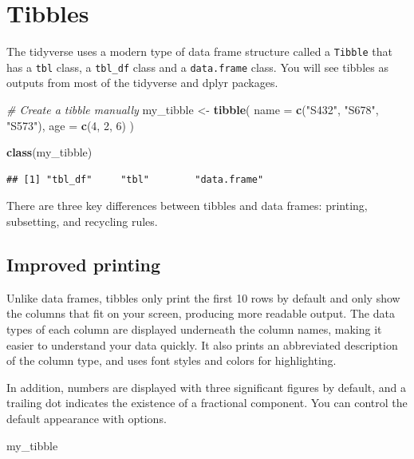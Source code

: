 \documentclass[
]{book}
\newenvironment{Shaded}{\begin{snugshade}}{\end{snugshade}}
\newcommand{\AttributeTok}[1]{\textcolor[rgb]{0.13,0.29,0.53}{#1}}
\newcommand{\CommentTok}[1]{\textcolor[rgb]{0.56,0.35,0.01}{\textit{#1}}}
\newcommand{\DecValTok}[1]{\textcolor[rgb]{0.00,0.00,0.81}{#1}}
\newcommand{\FunctionTok}[1]{\textcolor[rgb]{0.13,0.29,0.53}{\textbf{#1}}}
\newcommand{\NormalTok}[1]{#1}
\newcommand{\OtherTok}[1]{\textcolor[rgb]{0.56,0.35,0.01}{#1}}
\newcommand{\StringTok}[1]{\textcolor[rgb]{0.31,0.60,0.02}{#1}}
\begin{document}
\section{Tibbles}\label{tibbles}

The tidyverse uses a modern type of data frame structure called a \texttt{Tibble} that has a \texttt{tbl} class, a \texttt{tbl\_df} class and a \texttt{data.frame} class. You will see tibbles as outputs from most of the tidyverse and dplyr packages.

\begin{Shaded}
\begin{Highlighting}[]
\CommentTok{\# Create a tibble manually}
\NormalTok{my\_tibble }\OtherTok{\textless{}{-}} \FunctionTok{tibble}\NormalTok{(}
  \AttributeTok{name =} \FunctionTok{c}\NormalTok{(}\StringTok{"S432"}\NormalTok{, }\StringTok{"S678"}\NormalTok{, }\StringTok{"S573"}\NormalTok{),}
  \AttributeTok{age =} \FunctionTok{c}\NormalTok{(}\DecValTok{4}\NormalTok{, }\DecValTok{2}\NormalTok{, }\DecValTok{6}\NormalTok{)}
\NormalTok{)}

\FunctionTok{class}\NormalTok{(my\_tibble)}
\end{Highlighting}
\end{Shaded}

\begin{verbatim}
## [1] "tbl_df"     "tbl"        "data.frame"
\end{verbatim}

There are three key differences between tibbles and data frames: printing, subsetting, and recycling rules.

\subsection{Improved printing}\label{improved-printing}

Unlike data frames, tibbles only print the first 10 rows by default and only show the columns that fit on your screen, producing more readable output. The data types of each column are displayed underneath the column names, making it easier to understand your data quickly. It also prints an abbreviated description of the column type, and uses font styles and colors for highlighting.

In addition, numbers are displayed with three significant figures by default, and a trailing dot indicates the existence of a fractional component. You can control the default appearance with options.

\begin{Shaded}
\begin{Highlighting}[]
\NormalTok{my\_tibble}
\end{Highlighting}
\end{Shaded}
\end{document}
